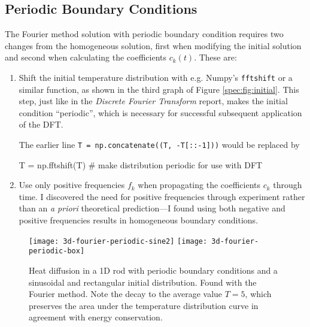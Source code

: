 \documentclass[11pt, a4paper]{article}
\begin{document}
\subsection{Periodic Boundary Conditions}
The Fourier method solution with periodic boundary condition requires two changes from the homogeneous solution, first when modifying the initial solution and second when calculating the coefficients $ c_{k}(t) $. These are:
\begin{enumerate}
	\item Shift the initial temperature distribution with e.g. Numpy's \texttt{fftshift} or a similar function, as shown in the third graph of Figure \ref{spec:fig:initial}. This step, just like in the \textit{Discrete Fourier Transform} report, makes the initial condition ``periodic'', which is necessary for successful subsequent application of the DFT.
	
	The earlier line \texttt{T = np.concatenate((T, -T[::-1]))} would be replaced by 
\begin{python}
T = np.fftshift(T)  # make distribution periodic for use with DFT
\end{python}

\item Use only positive frequencies $ f_{k} $ when propagating the coefficients $ c_{k} $ through time. I discovered the need for positive frequencies through experiment rather than an \textit{a priori} theoretical prediction---I found using both negative and positive frequencies results in homogeneous boundary conditions.
\end{enumerate}

\begin{figure}[htb!]
\centering
\texttt{[image: 3d-fourier-periodic-sine2]} \hfill
\texttt{[image: 3d-fourier-periodic-box]}
\caption{Heat diffusion in a 1D rod with periodic boundary conditions and a sinusoidal and rectangular initial distribution. Found with the Fourier method.  Note the decay to the average value $ T = 5 $, which preserves the area under the temperature distribution curve in agreement with energy conservation.}
\label{spec:fig:3d-fourier-periodic}
\end{figure}
\end{document}
